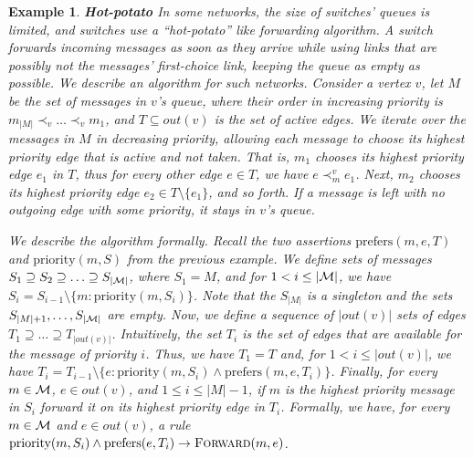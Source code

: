 \documentclass[11pt,eepic]{article}
\newcommand{\set}[1]{\{ #1  \}}
\newcommand{\M}{{\cal M}}
\newcommand{\Forw}{\mbox{\sc Forward}}
\newtheorem{exmpl}[theorem]{Example}
\newenvironment{example}{\begin{exmpl}\rm}{\hspace{\stretch{1}}\end{exmpl}}
\begin{document}
	\begin{example}	{\bf Hot-potato}
	\label{ex:hot-potato}
		In some networks, the size of switches' queues is limited, and switches use a ``hot-potato'' like forwarding algorithm. A switch forwards incoming messages as soon as they arrive while using links that are possibly not the messages' first-choice link, keeping the queue as empty as possible. We describe an algorithm for such networks. Consider a vertex $v$, let $M$ be the set of messages in $v$'s queue, where their order in increasing priority is $m_{|M|} \prec_v \ldots \prec_v m_1$, and $T \subseteq out(v)$ is the set of active edges. We iterate over the messages in $M$ in decreasing priority, allowing each message to choose its highest priority edge that is active and not taken. That is, $m_1$ chooses its highest priority edge $e_1$ in $T$, thus for every other edge $e \in T$, we have $e \prec_m^v e_1$. Next, $m_2$ chooses its highest priority edge $e_2 \in T \setminus \set{e_1}$, and so forth. If a message is left with no outgoing edge with some priority, it stays in $v$'s queue.

		We describe the algorithm formally.  Recall the two assertions $\mbox{prefers}(m, e, T)$ and $\mbox{priority}(m, S)$ from the previous example. We define sets of messages $S_1 \supseteq S_2 \supseteq \ldots \supseteq S_{|\M|}$, where $S_1 = M$, and for $1 < i \leq |\M|$, we have $S_i = S_{i-1} \setminus \set{m :\mbox{priority}(m, S_i)}$. Note that the $S_{|M|}$ is a singleton and the sets $S_{|M|+1}, \ldots, S_{|\M|}$ are empty. Now, we define a sequence of $|out(v)|$ sets of edges $T_1 \supseteq \ldots \supseteq T_{|out(v)|}$. Intuitively, the set $T_i$ is the set of edges that are available for the message of priority $i$. Thus, we have $T_1 = T$ and, for $1 < i \leq |out(v)|$, we have $T_i = T_{i-1} \setminus \set{e: \mbox{priority}(m, S_i) \wedge \mbox{prefers}(m, e, T_i)}$. Finally, for every $m \in \M$, $e \in out(v)$, and $1 \leq i \leq |M|-1$, if $m$ is the highest priority message in $S_i$ forward it on its highest priority edge in $T_i$.  Formally, we have, for every $m \in \M$ and $e \in out(v)$, a rule $\mbox{priority}(m, S_i) \wedge \mbox{prefers}(e, T_i) \rightarrow \Forw(m, e)$.
		\end{example}
\end{document}
